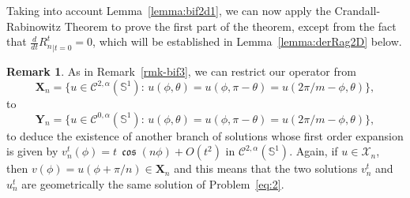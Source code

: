 \documentclass[10pt,reqno,english]{amsart}
\newcommand{\Su}{\mathbb{S}^1}
\theoremstyle{definition}
\newtheorem{remark}[lemma]{Remark}
\numberwithin{equation}{section}
\begin{document}
Taking into account Lemma~\ref{lemma:bif2d1}, we can now apply the Crandall-Rabinowitz Theorem to prove the first part of the theorem, except from the fact that $\frac{d}{dt}{R_n^t}_{|t=0}=0$, which will be established in Lemma~\ref{lemma:derRag2D} below.


\begin{remark}
\label{rmk-bif2}
As in Remark~\ref{rmk-bif3}, we can restrict our operator from
\[
\mathbf X_n=\{u\in\mathcal C^{2,\alpha}(\Su):\,u(\phi,\theta)=u(\phi,\pi-\theta)=u(2\pi/m-\phi,\theta)\},
\]
to
\[
\mathbf Y_n=\{u\in\mathcal C^{0,\alpha}(\Su):\,u(\phi,\theta)=u(\phi,\pi-\theta)=u(2\pi/m-\phi,\theta)\},
\]
to deduce the existence of another branch of solutions whose first order expansion is given by $v_n^t(\phi)=t\, \mathfrak \cos(n\phi) +O(t^2)$ in $\mathcal C^{2,\alpha}(\Su)$. Again, if $u\in\mathcal X_n$, then $v (\phi) = u (\phi+\pi/n)\in\mathbf X_n$ and this means that the two solutions $v_n^t$ and $u_n^t$ are geometrically the same solution of Problem~\eqref{eq:2}.
\end{remark}
\end{document}
